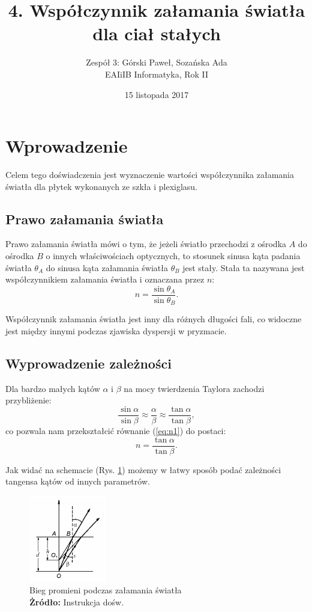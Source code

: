 \documentclass[12pt,a4paper]{article}
\title{4. Współczynnik załamania światła\\ dla ciał stałych}
\date{15 listopada 2017}
\author{
	Zespół 3: Górski Paweł, Sozańska Ada\\
	EAIiIB Informatyka, Rok II
}
\numberwithin{equation}{section}
\newcommand*{\captionsource}[2]{%
	\caption[{#1}]{%
		#1%
		\\\hspace{\linewidth}%
		\textbf{Żródło:} #2%
	}%
}
\begin{document}
\maketitle
\section{Wprowadzenie}
Celem tego doświadczenia jest wyznaczenie wartości współczynnika załamania światła dla płytek wykonanych ze szkła i plexiglasu.

\subsection{Prawo załamania światła}

Prawo załamania światła mówi o tym, że jeżeli światło przechodzi z ośrodka $A$ do ośrodka $B$ o innych właściwościach optycznych, to stosunek sinusa kąta padania światła $\theta_A$ do sinusa kąta załamania światła $\theta_B$ jest stały. Stała ta nazywana jest współczynnikiem załamania światła i oznaczana przez $n$:
\begin{equation}
	n = \frac{\sin \theta_A}{\sin \theta_B}.
	\label{eq:n1}
\end{equation}

Współczynnik załamania światła jest inny dla różnych długości fali, co widoczne jest między innymi podczas zjawiska dyspersji w pryzmacie.

\subsection{Wyprowadzenie zależności}

Dla bardzo małych kątów $\alpha$ i $\beta$ na mocy twierdzenia Taylora zachodzi przybliżenie:
\begin{equation}
	\frac{\sin \alpha}{\sin \beta} \approx \frac{\alpha}{\beta} \approx \frac{\tan \alpha}{\tan \beta},
\end{equation}
co pozwala nam przekształcić równanie (\ref{eq:n1}) do postaci:
\begin{equation}
	n = \frac{\tan \alpha}{\tan \beta}.
\end{equation}

Jak widać na schemacie (Rys. \ref{fig:img1}) możemy w łatwy sposób podać zależności tangensa kątów od innych parametrów.


\begin{figure}
	\centering
	\includegraphics[width=0.3\textwidth]{img/swiatlo.png} 
	\captionsource{Bieg promieni podczas załamania światła}{Instrukcja dośw.\\}
	\label{fig:img1}
\end{figure}
\end{document}
